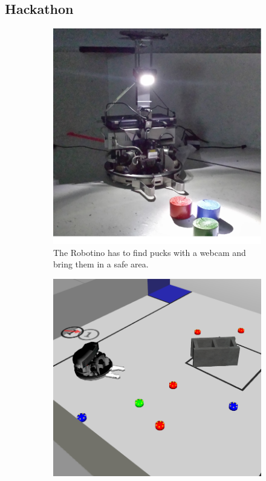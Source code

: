 \subsection{Hackathon}
\begin{figure}
  \centering
  \begin{subfigure}[b]{0.48\textwidth}
    \includegraphics[width=\textwidth]{pics/hackathon_real_de}
    \caption{The Robotino has to find pucks with a webcam and bring them in a safe area.}
    \label{fig:hackathon_real}
  \end{subfigure}
  \begin{subfigure}[b]{0.48\textwidth}
    \includegraphics[width=\textwidth]{pics/hackathon_sim}

\end{subfigure}
\end{figure}
